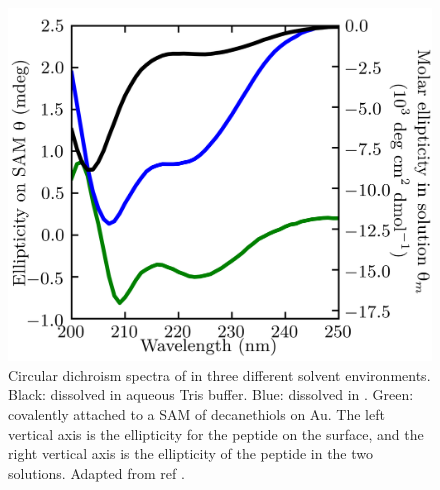 \begin{figure}  
    \center
    \includegraphics[width=\single]{figures-helix/nachos_cd_spectra.png}
    \caption[Circular dichroism spectra of \pep{} in three different solvent environments]{
        Circular dichroism spectra of \pep{} in three different solvent environments. 
        Black: \pep{} dissolved in aqueous Tris buffer. 
        Blue: \pep{} dissolved in \tbawat{}. 
        Green: \pep{} covalently attached to a SAM of decanethiols on Au. 
        The left vertical axis is the ellipticity for the peptide on the surface, and the right vertical axis is the ellipticity of the peptide in the two solutions. 
        Adapted from ref .
    }
    \label{fig:helix-cd_spectra}
\end{figure}

